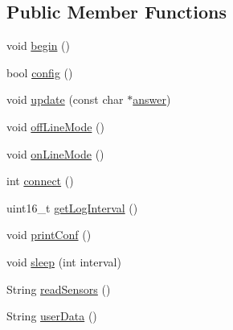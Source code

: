\subsection*{Public Member Functions}
\begin{DoxyCompactItemize}
\item 
void \hyperlink{classCoolBoard_acba7c5aef7268b2c0044bdb54d3b9d76}{begin} ()
\item 
bool \hyperlink{classCoolBoard_a583a874c09c07e70a6eb9229fc4beddb}{config} ()
\item 
void \hyperlink{classCoolBoard_a8612756d3f73198cdde857a66f0fe690}{update} (const char $\ast$\hyperlink{classCoolBoard_a7b835fafd449e5282f7f91d787a2dc15}{answer})
\item 
void \hyperlink{classCoolBoard_ae6b5e1274d760462290192acea4adca8}{off\+Line\+Mode} ()
\item 
void \hyperlink{classCoolBoard_aa0bbc4bc605e35618d18e68795c61363}{on\+Line\+Mode} ()
\item 
int \hyperlink{classCoolBoard_a519de78b807f8ec6463ff484eb925918}{connect} ()
\item 
uint16\+\_\+t \hyperlink{classCoolBoard_aaa24480b273fc095a1356a589c333781}{get\+Log\+Interval} ()
\item 
void \hyperlink{classCoolBoard_a486507b8f0981d3cc671ed31c2145755}{print\+Conf} ()
\item 
void \hyperlink{classCoolBoard_a5d0c8ff93b615efd676be432de9f164a}{sleep} (int interval)
\item 
String \hyperlink{classCoolBoard_ad03abdce2e65f520bbf2cff0f2d083cf}{read\+Sensors} ()
\item 
String \hyperlink{classCoolBoard_ae7358fb6e623cfc81b775f5f1734909b}{user\+Data} ()
\end{DoxyCompactItemize}

